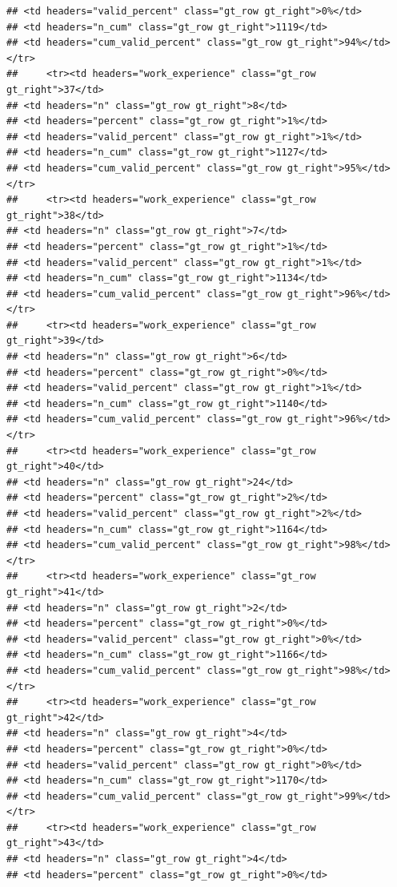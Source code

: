\documentclass[
  a4paper,
  DIV=11,
  numbers=noendperiod]{scrartcl}
\begin{document}
\begin{verbatim}
## <td headers="valid_percent" class="gt_row gt_right">0%</td>
## <td headers="n_cum" class="gt_row gt_right">1119</td>
## <td headers="cum_valid_percent" class="gt_row gt_right">94%</td></tr>
##     <tr><td headers="work_experience" class="gt_row gt_right">37</td>
## <td headers="n" class="gt_row gt_right">8</td>
## <td headers="percent" class="gt_row gt_right">1%</td>
## <td headers="valid_percent" class="gt_row gt_right">1%</td>
## <td headers="n_cum" class="gt_row gt_right">1127</td>
## <td headers="cum_valid_percent" class="gt_row gt_right">95%</td></tr>
##     <tr><td headers="work_experience" class="gt_row gt_right">38</td>
## <td headers="n" class="gt_row gt_right">7</td>
## <td headers="percent" class="gt_row gt_right">1%</td>
## <td headers="valid_percent" class="gt_row gt_right">1%</td>
## <td headers="n_cum" class="gt_row gt_right">1134</td>
## <td headers="cum_valid_percent" class="gt_row gt_right">96%</td></tr>
##     <tr><td headers="work_experience" class="gt_row gt_right">39</td>
## <td headers="n" class="gt_row gt_right">6</td>
## <td headers="percent" class="gt_row gt_right">0%</td>
## <td headers="valid_percent" class="gt_row gt_right">1%</td>
## <td headers="n_cum" class="gt_row gt_right">1140</td>
## <td headers="cum_valid_percent" class="gt_row gt_right">96%</td></tr>
##     <tr><td headers="work_experience" class="gt_row gt_right">40</td>
## <td headers="n" class="gt_row gt_right">24</td>
## <td headers="percent" class="gt_row gt_right">2%</td>
## <td headers="valid_percent" class="gt_row gt_right">2%</td>
## <td headers="n_cum" class="gt_row gt_right">1164</td>
## <td headers="cum_valid_percent" class="gt_row gt_right">98%</td></tr>
##     <tr><td headers="work_experience" class="gt_row gt_right">41</td>
## <td headers="n" class="gt_row gt_right">2</td>
## <td headers="percent" class="gt_row gt_right">0%</td>
## <td headers="valid_percent" class="gt_row gt_right">0%</td>
## <td headers="n_cum" class="gt_row gt_right">1166</td>
## <td headers="cum_valid_percent" class="gt_row gt_right">98%</td></tr>
##     <tr><td headers="work_experience" class="gt_row gt_right">42</td>
## <td headers="n" class="gt_row gt_right">4</td>
## <td headers="percent" class="gt_row gt_right">0%</td>
## <td headers="valid_percent" class="gt_row gt_right">0%</td>
## <td headers="n_cum" class="gt_row gt_right">1170</td>
## <td headers="cum_valid_percent" class="gt_row gt_right">99%</td></tr>
##     <tr><td headers="work_experience" class="gt_row gt_right">43</td>
## <td headers="n" class="gt_row gt_right">4</td>
## <td headers="percent" class="gt_row gt_right">0%</td>

\end{verbatim}
\end{document}
